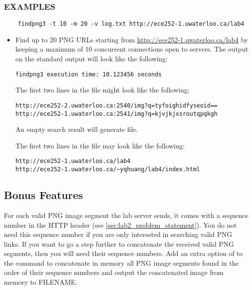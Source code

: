 \subsubsection*{EXAMPLES}
\begin{verbatim}
    findpng3 -t 10 -m 20 -v log.txt http://ece252-1.uwaterloo.ca/lab4
\end{verbatim}
\begin{itemize}
\item[]Find up to 20 PNG URLs starting from \url{http://ece252-1.uwaterloo.ca/lab4} by keeping a maximum of 10 concurrent connections open to servers.
The output on the standard output will look like the following:
\begin{verbatim}
findpng3 execution time: 10.123456 seconds
\end{verbatim}
The first two lines in the  file might look like the following:
\begin{verbatim}
http://ece252-2.uwaterloo.ca:2540/img?q=tyfoighidfyseoid==
http://ece252-1.uwaterloo.ca:2541/img?q=kjvjkjxsroutqpqkgh
\end{verbatim}
An empty search result will generate  file.

The first two lines in the  file may look like the following:
\begin{verbatim}
http://ece252-1.uwaterloo.ca/lab4
http://ece252-1.uwaterloo.ca/~yqhuang/lab4/index.html
\end{verbatim}
\end{itemize}

\iffalse
\subsection{Bonus Features}
\label{sec:findpng3_bonus}
For each valid PNG image segment the lab server sends, it comes with a sequence number in the HTTP header (see \ref{sec:lab2_problem_statement}). You do not need this sequence number if you are only interested in searching valid PNG links. If you want to go a step further to concatenate the received valid PNG segments, then you will need their sequence numbers. Add an extra option of  to the  command to concatenate in memory all PNG image segments found in the order of their sequence numbers and output the concatenated image from memory to FILENAME. 
